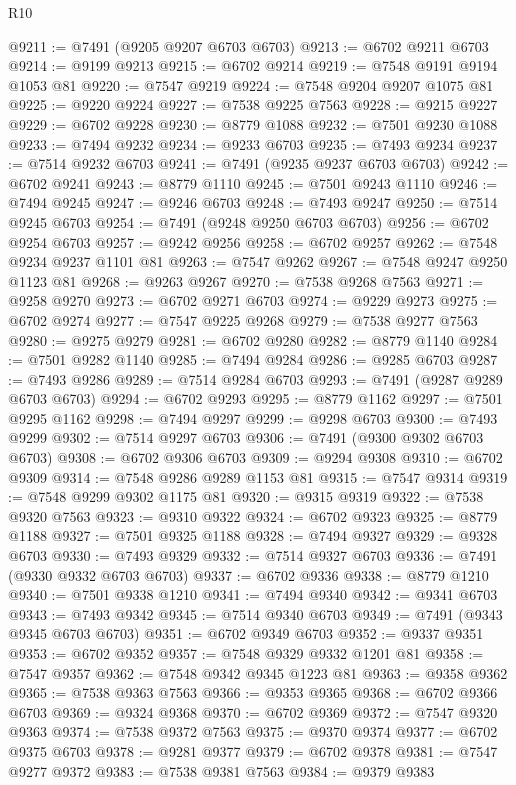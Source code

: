 \begin{lexlean}{R10}
\begin{coremodule}
@9211 := @7491 (@9205 @9207 @6703 @6703)
@9213 := @6702 @9211 @6703
@9214 := @9199 @9213
@9215 := @6702 @9214
@9219 := @7548 @9191 @9194 @1053 @81
@9220 := @7547 @9219
@9224 := @7548 @9204 @9207 @1075 @81
@9225 := @9220 @9224
@9227 := @7538 @9225 @7563
@9228 := @9215 @9227
@9229 := @6702 @9228
@9230 := @8779 @1088
@9232 := @7501 @9230 @1088
@9233 := @7494 @9232
@9234 := @9233 @6703
@9235 := @7493 @9234
@9237 := @7514 @9232 @6703
@9241 := @7491 (@9235 @9237 @6703 @6703)
@9242 := @6702 @9241
@9243 := @8779 @1110
@9245 := @7501 @9243 @1110
@9246 := @7494 @9245
@9247 := @9246 @6703
@9248 := @7493 @9247
@9250 := @7514 @9245 @6703
@9254 := @7491 (@9248 @9250 @6703 @6703)
@9256 := @6702 @9254 @6703
@9257 := @9242 @9256
@9258 := @6702 @9257
@9262 := @7548 @9234 @9237 @1101 @81
@9263 := @7547 @9262
@9267 := @7548 @9247 @9250 @1123 @81
@9268 := @9263 @9267
@9270 := @7538 @9268 @7563
@9271 := @9258 @9270
@9273 := @6702 @9271 @6703
@9274 := @9229 @9273
@9275 := @6702 @9274
@9277 := @7547 @9225 @9268
@9279 := @7538 @9277 @7563
@9280 := @9275 @9279
@9281 := @6702 @9280
@9282 := @8779 @1140
@9284 := @7501 @9282 @1140
@9285 := @7494 @9284
@9286 := @9285 @6703
@9287 := @7493 @9286
@9289 := @7514 @9284 @6703
@9293 := @7491 (@9287 @9289 @6703 @6703)
@9294 := @6702 @9293
@9295 := @8779 @1162
@9297 := @7501 @9295 @1162
@9298 := @7494 @9297
@9299 := @9298 @6703
@9300 := @7493 @9299
@9302 := @7514 @9297 @6703
@9306 := @7491 (@9300 @9302 @6703 @6703)
@9308 := @6702 @9306 @6703
@9309 := @9294 @9308
@9310 := @6702 @9309
@9314 := @7548 @9286 @9289 @1153 @81
@9315 := @7547 @9314
@9319 := @7548 @9299 @9302 @1175 @81
@9320 := @9315 @9319
@9322 := @7538 @9320 @7563
@9323 := @9310 @9322
@9324 := @6702 @9323
@9325 := @8779 @1188
@9327 := @7501 @9325 @1188
@9328 := @7494 @9327
@9329 := @9328 @6703
@9330 := @7493 @9329
@9332 := @7514 @9327 @6703
@9336 := @7491 (@9330 @9332 @6703 @6703)
@9337 := @6702 @9336
@9338 := @8779 @1210
@9340 := @7501 @9338 @1210
@9341 := @7494 @9340
@9342 := @9341 @6703
@9343 := @7493 @9342
@9345 := @7514 @9340 @6703
@9349 := @7491 (@9343 @9345 @6703 @6703)
@9351 := @6702 @9349 @6703
@9352 := @9337 @9351
@9353 := @6702 @9352
@9357 := @7548 @9329 @9332 @1201 @81
@9358 := @7547 @9357
@9362 := @7548 @9342 @9345 @1223 @81
@9363 := @9358 @9362
@9365 := @7538 @9363 @7563
@9366 := @9353 @9365
@9368 := @6702 @9366 @6703
@9369 := @9324 @9368
@9370 := @6702 @9369
@9372 := @7547 @9320 @9363
@9374 := @7538 @9372 @7563
@9375 := @9370 @9374
@9377 := @6702 @9375 @6703
@9378 := @9281 @9377
@9379 := @6702 @9378
@9381 := @7547 @9277 @9372
@9383 := @7538 @9381 @7563
@9384 := @9379 @9383

\end{coremodule}
\end{lexlean}
